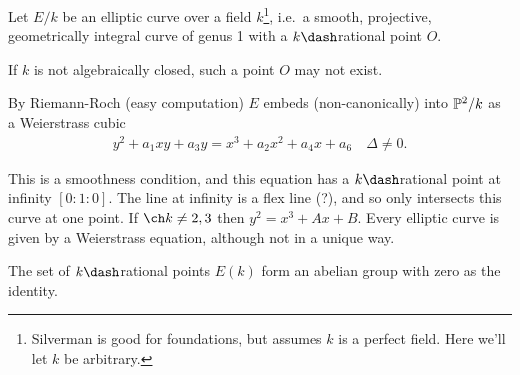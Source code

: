 Let \(E/k\) be an elliptic curve over a field \(k\)\footnote{Silverman
  is good for foundations, but assumes \(k\) is a perfect field. Here
  we'll let \(k\) be arbitrary.}, i.e.~a smooth, projective,
geometrically integral curve of genus 1 with a \(k\dash\)rational point
\(O\).

\begin{remark}

If \(k\) is not algebraically closed, such a point \(O\) may not exist.

By Riemann-Roch (easy computation) \(E\) embeds (non-canonically) into
\(\Bbb{P}^2/k\) as a Weierstrass cubic \begin{align*}
y^2 + a_1 xy + a_3 y = x^3 + a_2 x^2 + a_4 x + a_6 \quad \Delta \neq 0
.\end{align*}

This is a smoothness condition, and this equation has a
\(k\dash\)rational point at infinity \([0: 1: 0]\). The line at infinity
is a flex line (?), and so only intersects this curve at one point. If
\(\ch k \neq 2,3\) then \(y^2 = x^3 + Ax + B\). Every elliptic curve is
given by a Weierstrass equation, although not in a unique way.

\end{remark}

\begin{fact}

The set of \(k\dash\)rational points \(E(k)\) form an abelian group with
zero as the identity.

\end{fact}

